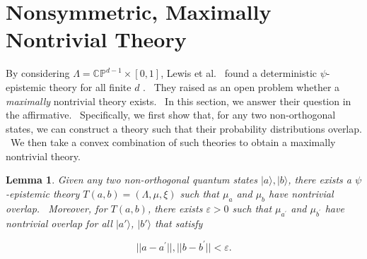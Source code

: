 \documentclass[letterpaper,11pt]{article}
\newtheorem{lem}{Lemma}
\begin{document}
\section{Nonsymmetric, Maximally Nontrivial Theory}

By considering $\Lambda = \mathbb{CP}^{d-1} \times [0,1]$, Lewis et al.\ \cite{lewis}
found a deterministic $\psi$-epistemic theory for all finite $d$%
. \ They raised as an open problem whether a \emph{maximally} nontrivial
theory exists. \ In this section, we answer their question in the
affirmative. \ Specifically, we first show
that, for any two non-orthogonal states, we can construct a theory such that
their probability distributions overlap. \ We then take a convex combination
of such theories to obtain a maximally nontrivial theory.

\begin{lem}
\label{mix} Given any two non-orthogonal quantum states $ | a
\rangle, | b \rangle $, there exists a $\psi$-epistemic
theory $T(a,b)=(\Lambda,\mu,\xi)$ such that $\mu_a$ and $%
\mu_b$ have nontrivial overlap. \ Moreover, for $T(a,b)$, there
exists $\varepsilon>0$ such that $\mu_{a^{\prime }}$ and $\mu_{b^{\prime
}}$ have nontrivial overlap for all $ | a' \rangle $, $
| b' \rangle $ that satisfy

\[ ||a-a^{\prime }||,||b-b^{\prime
}||<\varepsilon. \]
\end{lem}
\end{document}
